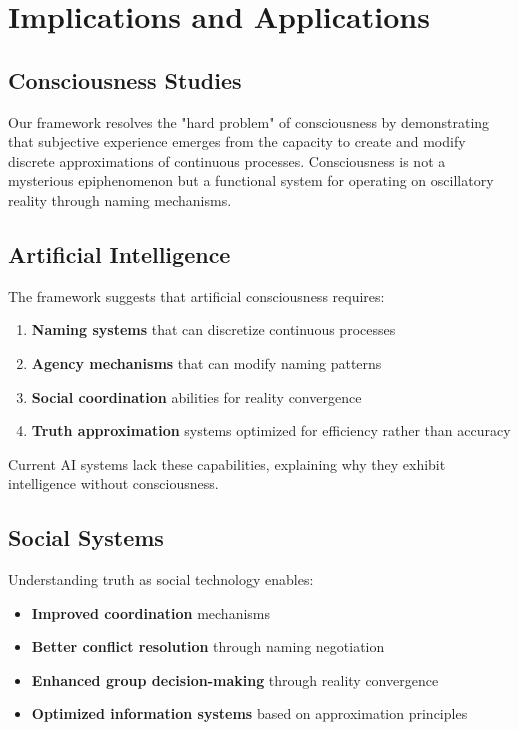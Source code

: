 \documentclass[12pt]{article}
\begin{document}
\section{Implications and Applications}

\subsection{Consciousness Studies}

Our framework resolves the "hard problem" of consciousness by demonstrating that subjective experience emerges from the capacity to create and modify discrete approximations of continuous processes. Consciousness is not a mysterious epiphenomenon but a functional system for operating on oscillatory reality through naming mechanisms.

\subsection{Artificial Intelligence}

The framework suggests that artificial consciousness requires:

\begin{enumerate}
\item \textbf{Naming systems} that can discretize continuous processes
\item \textbf{Agency mechanisms} that can modify naming patterns
\item \textbf{Social coordination} abilities for reality convergence
\item \textbf{Truth approximation} systems optimized for efficiency rather than accuracy
\end{enumerate}

Current AI systems lack these capabilities, explaining why they exhibit intelligence without consciousness.

\subsection{Social Systems}

Understanding truth as social technology enables:

\begin{itemize}
\item \textbf{Improved coordination} mechanisms
\item \textbf{Better conflict resolution} through naming negotiation
\item \textbf{Enhanced group decision-making} through reality convergence
\item \textbf{Optimized information systems} based on approximation principles
\end{itemize}
\end{document}
